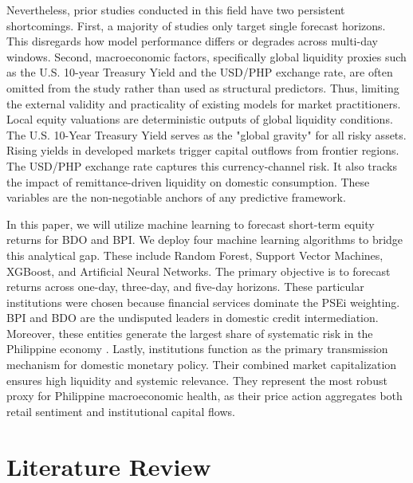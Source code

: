 \documentclass[12pt]{article}
\begin{document}
Nevertheless, prior studies conducted in this field have two persistent shortcomings. First, a majority of studies only target single forecast horizons. This disregards how model performance differs or degrades across multi-day windows. Second, macroeconomic factors, specifically global liquidity proxies such as the U.S. 10-year Treasury Yield and the USD/PHP exchange rate, are often omitted from the study rather than used as structural predictors. Thus, limiting the external validity and practicality of existing models for market practitioners. Local equity valuations are deterministic outputs of global liquidity conditions. The U.S. 10-Year Treasury Yield serves as the "global gravity" for all risky assets. Rising yields in developed markets trigger capital outflows from frontier regions. The USD/PHP exchange rate captures this currency-channel risk. It also tracks the impact of remittance-driven liquidity on domestic consumption. These variables are the non-negotiable anchors of any predictive framework.


In this paper, we will utilize machine learning to forecast short-term equity returns for BDO and BPI. We deploy four machine learning algorithms to bridge this analytical gap. These include Random Forest, Support Vector Machines, XGBoost, and Artificial Neural Networks. The primary objective is to forecast returns across one-day, three-day, and five-day horizons.  These particular institutions were chosen because financial services dominate the PSEi weighting. BPI and BDO are the undisputed leaders in domestic credit intermediation. Moreover, these entities generate the largest share of systematic risk in the Philippine economy \parencite{godoy2025measuring}. Lastly, institutions function as the primary transmission mechanism for domestic monetary policy. Their combined market capitalization ensures high liquidity and systemic relevance. They represent the most robust proxy for Philippine macroeconomic health, as their price action aggregates both retail sentiment and institutional capital flows.


\section{Literature Review}
\label{sec:litreview}
\end{document}
